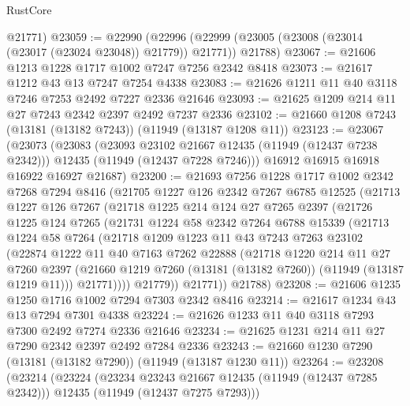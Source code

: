 \begin{lexlean}{RustCore}
\begin{coremodule}
      @21771)
@23059 := @22990
    (@22996 (@22999 (@23005 (@23008 (@23014 (@23017 (@23024 @23048)) @21779)) @21771)) @21788)
@23067 := @21606 @1213 @1228 @1717 @1002 @7247 @7256 @2342 @8418
@23073 := @21617 @1212 @43 @13 @7247 @7254 @4338
@23083 := @21626 @1211 @11 @40 @3118 @7246 @7253 @2492 @7227 @2336 @21646
@23093 := @21625 @1209 @214 @11 @27 @7243 @2342 @2397 @2492 @7237 @2336
@23102 := @21660 @1208 @7243 (@13181 (@13182 @7243)) (@11949 (@13187 @1208 @11))
@23123 := @23067
    (@23073
      (@23083
        (@23093 @23102 @21667 @12435 (@11949 (@12437 @7238 @2342)))
        @12435
        (@11949 (@12437 @7228 @7246)))
      @16912
      @16915
      @16918
      @16922
      @16927
      @21687)
@23200 := @21693
    @7256
    @1228
    @1717
    @1002
    @2342
    @7268
    @7294
    @8416
    (@21705
      @1227
      @126
      @2342
      @7267
      @6785
      @12525
      (@21713
        @1227
        @126
        @7267
        (@21718
          @1225
          @214
          @124
          @27
          @7265
          @2397
          (@21726
            @1225
            @124
            @7265
            (@21731
              @1224
              @58
              @2342
              @7264
              @6788
              @15339
              (@21713
                @1224
                @58
                @7264
                (@21718
                  @1209
                  @1223
                  @11
                  @43
                  @7243
                  @7263
                  @23102
                  (@22874
                    @1222
                    @11
                    @40
                    @7163
                    @7262
                    @22888
                    (@21718
                      @1220
                      @214
                      @11
                      @27
                      @7260
                      @2397
                      (@21660 @1219 @7260 (@13181 (@13182 @7260)) (@11949 (@13187 @1219 @11)))
                      @21771))))
              @21779))
          @21771))
      @21788)
@23208 := @21606 @1235 @1250 @1716 @1002 @7294 @7303 @2342 @8416
@23214 := @21617 @1234 @43 @13 @7294 @7301 @4338
@23224 := @21626 @1233 @11 @40 @3118 @7293 @7300 @2492 @7274 @2336 @21646
@23234 := @21625 @1231 @214 @11 @27 @7290 @2342 @2397 @2492 @7284 @2336
@23243 := @21660 @1230 @7290 (@13181 (@13182 @7290)) (@11949 (@13187 @1230 @11))
@23264 := @23208
    (@23214
      (@23224
        (@23234 @23243 @21667 @12435 (@11949 (@12437 @7285 @2342)))
        @12435
        (@11949 (@12437 @7275 @7293)))

\end{coremodule}
\end{lexlean}

